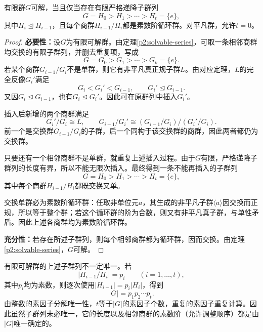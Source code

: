 \begin{theorem}\label{p2:finite-solvable-series}
有限群$G$可解，当且仅当存在有限严格递降子群列
\[
G=H_0>H_1>\cdots>H_t=\{e\},
\]
其中$H_i\trianglelefteq H_{i-1}$，且每个商群$H_{i-1}/H_i$都是素数阶循环群。对平凡群，允许$t=0$。
\end{theorem}
\begin{proof}
\textbf{必要性：}设$G$为有限可解群。由定理\ref{p2:solvable-series}，可取一条相邻商群均交换的有限子群列，并删去重复项，写成
\[
G=G_0>G_1>\cdots>G_k=\{e\}.
\]
若某个商群$G_{i-1}/G_i$不是单群，则它有非平凡真正规子群$L$。由对应定理，$L$的完全反像$G_i'$满足
\[
G_i<G_i'<G_{i-1},\qquad G_i'\trianglelefteq G_{i-1}.
\]
又因$G_i\trianglelefteq G_{i-1}$，也有$G_i\trianglelefteq G_i'$。因此可在原群列中插入$G_i'$。

插入后新增的两个商群满足
\[
G_i'/G_i\cong L,\qquad
G_{i-1}/G_i'\cong(G_{i-1}/G_i)/(G_i'/G_i).
\]
前一个是交换群$G_{i-1}/G_i$的子群，后一个同构于该交换群的商群，因此两者都仍为交换群。

只要还有一个相邻商群不是单群，就重复上述插入过程。由于$G$有限，严格递降子群列的长度有界，所以不能无限次插入。最终得到一条不能再插入的子群列
\[
G=H_0>H_1>\cdots>H_t=\{e\},
\]
其中每个商群$H_{i-1}/H_i$都既交换又单。

交换单群必为素数阶循环群：任取非单位元$a$，其生成的非平凡子群$\langle a\rangle$因交换而正规，所以等于整个群；若这个循环群的阶为合数，则又有非平凡真子群，与单性矛盾。因此上述各商群均为素数阶循环群。

\textbf{充分性：}若存在所述子群列，则每个相邻商群都为循环群，因而交换。由定理\ref{p2:solvable-series}，$G$可解。
\end{proof}

\begin{remark}
有限可解群的上述子群列不一定唯一。若
\[
|H_{i-1}/H_i|=p_i\qquad(i=1,\ldots,t),
\]
其中$p_i$均为素数，则逐次使用$|H_{i-1}|=p_i|H_i|$，得到
\[
|G|=p_1p_2\cdots p_t.
\]
由整数的素因子分解唯一性，$t$等于$|G|$的素因子个数，重复的素因子重复计算。因此虽然子群列未必唯一，它的长度以及相邻商群的素数阶（允许调整顺序）都是由$|G|$唯一确定的。
\end{remark}

